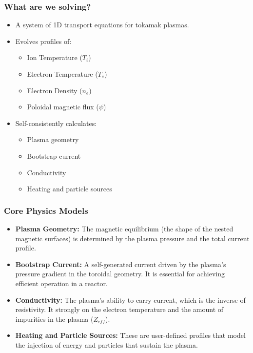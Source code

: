 \documentclass[10pt,aspectratio=169]{beamer}
\begin{document}
\begin{frame}
  \frametitle{What are we solving?}
  \begin{itemize}
    \item A system of 1D transport equations for tokamak plasmas.
    \item Evolves profiles of:
    \begin{itemize}
        \item Ion Temperature ($T_i$)
        \item Electron Temperature ($T_e$)
        \item Electron Density ($n_e$)
        \item Poloidal magnetic flux ($\psi$)
    \end{itemize}
    \item Self-consistently calculates:
    \begin{itemize}
        \item Plasma geometry
        \item Bootstrap current
        \item Conductivity
        \item Heating and particle sources
    \end{itemize}
  \end{itemize}
\end{frame}

\begin{frame}
  \frametitle{Core Physics Models}
  \begin{itemize}
    \item \textbf{Plasma Geometry:} The magnetic equilibrium (the shape of the nested magnetic surfaces) is determined by the plasma pressure and the total current profile.
    \item \textbf{Bootstrap Current:} A self-generated current driven by the plasma's pressure gradient in the toroidal geometry. It is essential for achieving efficient operation in a reactor.
    \item \textbf{Conductivity:} The plasma's ability to carry current, which is the inverse of resistivity. It strongly on the electron temperature and the amount of impurities in the plasma ($Z_{eff}$).
    \item \textbf{Heating and Particle Sources:} These are user-defined profiles that model the injection of energy and particles that sustain the plasma.
  \end{itemize}
\end{frame}
\end{document}
